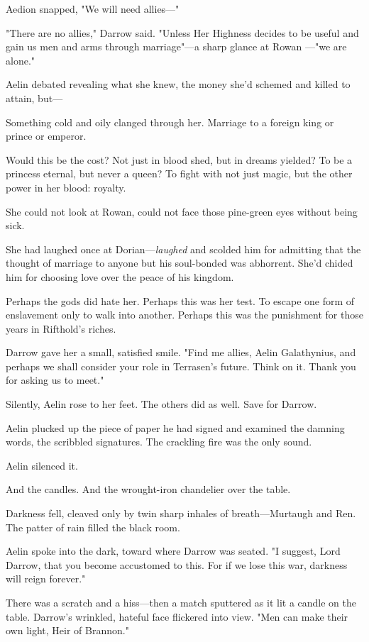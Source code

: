 Aedion snapped, "We will need allies---"

"There are no allies," Darrow said.
"Unless Her Highness decides to be useful and gain us men and arms through marriage"---a sharp glance at Rowan ---"we are alone."

Aelin debated revealing what she knew, the money she'd schemed and killed to attain, but---

Something cold and oily clanged through her.
Marriage to a foreign king or prince or emperor.

Would this be the cost? 
Not just in blood shed, but in dreams yielded?
To be a princess eternal, but never a queen? 
To fight with not just magic, but the other power in her blood: royalty.

She could not look at Rowan, could not face those pine-green eyes without being sick.

She had laughed once at Dorian---\emph{laughed} and scolded him for admitting that the thought of marriage to anyone but his soul-bonded was abhorrent.
She'd chided him for choosing love over the peace of his kingdom.

Perhaps the gods did hate her.
Perhaps this was her test.
To escape one form of enslavement only to walk into another.
Perhaps this was the punishment for those years in Rifthold's riches.

Darrow gave her a small, satisfied smile.
"Find me allies, Aelin Galathynius, and perhaps we shall consider your role in Terrasen's future.
Think on it.
Thank you for asking us to meet."

Silently, Aelin rose to her feet.
The others did as well.
Save for Darrow.

Aelin plucked up the piece of paper he had signed and examined the damning words, the scribbled signatures.
The crackling fire was the only sound.

Aelin silenced it.

And the candles.
And the wrought-iron chandelier over the table.

Darkness fell, cleaved only by twin sharp inhales of breath---Murtaugh and Ren.
The patter of rain filled the black room.

Aelin spoke into the dark, toward where Darrow was seated.
"I suggest, Lord Darrow, that you become accustomed to this.
For if we lose this war, darkness will reign forever."

There was a scratch and a hiss---then a match sputtered as it lit a candle on the table.
Darrow's wrinkled, hateful face flickered into view.
"Men can make their own light, Heir of Brannon."

